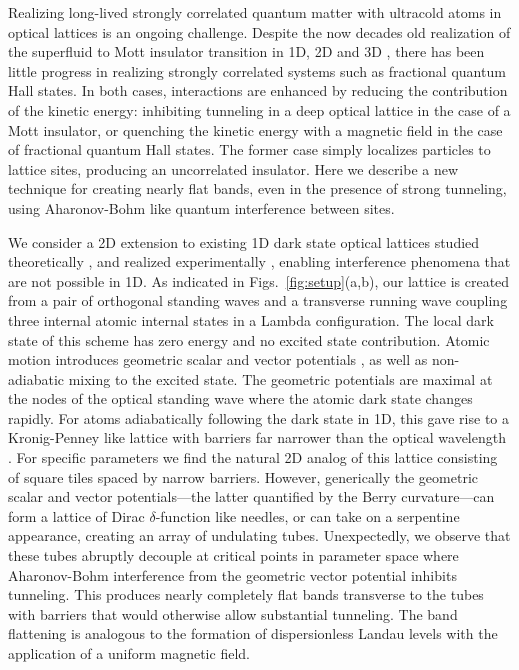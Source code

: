 \documentclass[aps,pra,twocolumn,showpacs,superscriptaddress,floatfix,longbibliography]{revtex4-1}
\begin{document}

Realizing long-lived strongly correlated quantum matter with ultracold atoms in optical lattices is an ongoing challenge.
Despite the now decades old realization of the superfluid to Mott insulator transition in 1D, 2D and 3D \cite{Greiner2002,Stoferle2004,Spielman2007}, there has been little progress in realizing strongly correlated systems such as fractional quantum Hall states.
In both cases, interactions are enhanced by reducing the contribution of the kinetic energy: inhibiting tunneling in a deep optical lattice in the case of a Mott insulator, or quenching the kinetic energy with a magnetic field in the case of fractional quantum Hall states.
The former case simply localizes particles to lattice sites, producing an uncorrelated insulator. 
Here we describe a new technique for creating nearly flat bands, even in the presence of strong tunneling, using Aharonov-Bohm like quantum interference between sites.

We consider a 2D extension to existing 1D dark state optical lattices studied theoretically \cite{Zoller2016, Jendrzejewski2016, Zubairy2020, Kubala2021, Gvozdiovas2021}, and realized experimentally \cite{Wang2018, Tsui2020}, enabling interference phenomena that are not possible in 1D.
As indicated in Figs.~\ref{fig:setup}(a,b), our lattice is created from a pair of orthogonal standing waves and a transverse running wave coupling three internal atomic internal states in a Lambda configuration.
The local dark state of this scheme has zero energy and no excited state contribution.
Atomic motion introduces geometric scalar and vector potentials \cite{Dum1996,Juzeliunas2005,Goldman2014}, as well as non-adiabatic mixing to the excited state.
The geometric potentials are maximal at the nodes of the optical standing wave where the atomic dark state changes rapidly.
For atoms adiabatically following the dark state in 1D, this gave rise to a Kronig-Penney like lattice with barriers far narrower than the optical wavelength \cite{Zoller2016, Jendrzejewski2016,Wang2018}.
For specific parameters we find the natural 2D analog of this lattice consisting of square tiles spaced by narrow barriers.
However, generically the geometric  scalar and vector potentials---the latter quantified by the Berry curvature---can form a lattice of Dirac $\delta$-function like needles, or can take on a serpentine appearance, creating an array of undulating tubes.
Unexpectedly, we observe that these tubes abruptly decouple at critical points in parameter space where Aharonov-Bohm interference from the geometric vector potential inhibits tunneling.
This produces nearly completely flat bands transverse to the tubes with barriers that would otherwise allow substantial tunneling.
The band flattening is analogous to the formation of dispersionless Landau levels with the application of a uniform magnetic field.
\end{document}
